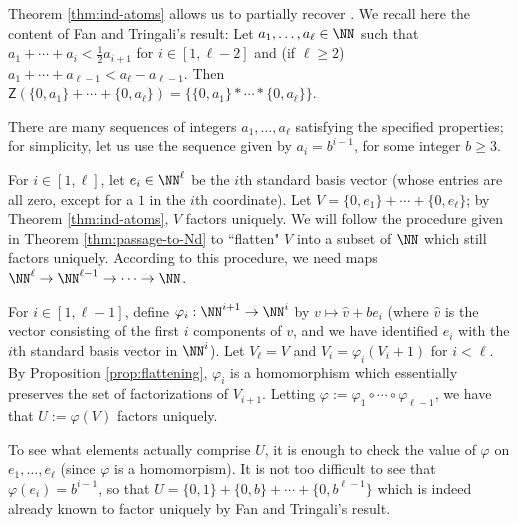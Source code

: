 \begin{eg} \label{eg:recover-flat-unique-fac}
Theorem \ref{thm:ind-atoms} allows us to partially recover \cite[Proposition 4.9]{fan-tringali18}.
We recall here the content of Fan and Tringali's result: Let $a_1,\dots, a_\ell \in \NN$ such that $a_1 + \cdots + a_i < \frac{1}{2} a_{i+1}$ for $i\in [ 1,\ell-2 ]$ and (if $\ell \ge 2$) $a_1+\cdots + a_{\ell-1} < a_\ell - a_{\ell-1}$.
Then $\mathsf{Z}(\{0,a_1\}+\cdots+\{0,a_\ell\}) = \{ \{0,a_1\}*\cdots*\{0,a_\ell\}\}$.

There are many sequences of integers $a_1,\dots,a_\ell$ satisfying the specified properties; for simplicity, let us use the sequence given by $a_i = b^{i-1}$, for some integer $b \ge 3$.

For $i\in [ 1,\ell ]$, let $e_i \in \NN^\ell$ be the $i$th standard basis vector (whose entries are all zero, except for a $1$ in the $i$th coordinate).
Let $V = \{0,e_1\} + \cdots + \{0,e_\ell\}$; by Theorem \ref{thm:ind-atoms}, $V$ factors uniquely.
We will follow the procedure given in Theorem \ref{thm:passage-to-Nd} to ``flatten" $V$ into a subset of $\NN$ which still factors uniquely.
According to this procedure, we need maps $\NN^\ell \to \NN^{\ell-1} \to \dots \to \NN$.

For $i\in [ 1,\ell-1 ]$, define $\varphi_i: \NN^{i+1} \to \NN^{i}$ by $v \mapsto \hat{v} + be_{i}$ (where $\hat{v}$ is the vector consisting of the first $i$ components of $v$, and we have identified $e_i$ with the $i$th standard basis vector in $\NN^i$).
Let $V_\ell = V$ and $V_i = \varphi_i(V_i+1)$ for $i <\ell$.
By Proposition \ref{prop:flattening}, $\varphi_i$ is a homomorphism which essentially preserves the set of factorizations of $V_{i+1}$.
Letting $\varphi := \varphi_1\circ \cdots \circ \varphi_{\ell-1}$, we have that $U := \varphi(V)$ factors uniquely.

To see what elements actually comprise $U$, it is enough to check the value of $\varphi$ on $e_1,\dots, e_\ell$ (since $\varphi$ is a homomorpism).
It is not too difficult to see that $\varphi(e_i) = b^{i-1}$, so that $U = \{0,1\}+\{0,b\}+\cdots+\{0,b^{\ell-1}\}$ which is indeed already known to factor uniquely by Fan and Tringali's result.
\end{eg}



